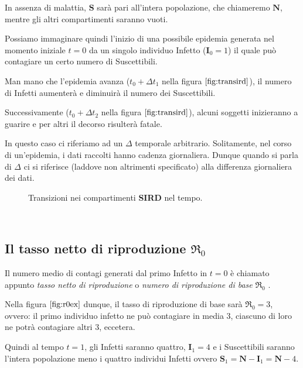 \documentclass[11pt]{article}
\begin{document}
In assenza di malattia, \(\mathbf{S}\) sarà pari all'intera popolazione,
che chiameremo \(\mathbf{N}\), mentre gli altri compartimenti saranno
vuoti.

Possiamo immaginare quindi l'inizio di una possibile epidemia generata
nel momento iniziale \(t=0\) da un singolo individuo Infetto
(\(\mathbf{I}_0 = 1\)) il quale può contagiare un certo numero di
Suscettibili.

Man mano che l'epidemia avanza (\(t_0 + \Delta t_1\) nella figura
\(\ref{fig:transird}\)), il numero di Infetti aumenterà e diminuirà il
numero dei Suscettibili.

Successivamente (\(t_0 + \Delta t_2\) nella figura
\(\ref{fig:transird}\)), alcuni soggetti inizieranno a guarire e per
altri il decorso risulterà fatale.

In questo caso ci riferiamo ad un \(\Delta\) temporale arbitrario.
Solitamente, nel corso di un'epidemia, i dati raccolti hanno cadenza
giornaliera. Dunque quando si parla di \(\Delta\) ci si riferisce
(laddove non altrimenti specificato) alla differenza giornaliera dei
dati.

    \begin{figure}
    \caption{Transizioni nei compartimenti \textbf{SIRD} nel tempo.}
    \label{fig:transird}
    \end{figure}
    { \hspace*{\fill} \\}
    
    \hypertarget{il-tasso-netto-di-riproduzione-re_0}{%
\subsection{\texorpdfstring{Il tasso netto di riproduzione
\(\Re_0\)}{Il tasso netto di riproduzione \textbackslash Re\_0}}\label{il-tasso-netto-di-riproduzione-re_0}}

    Il numero medio di contagi generati dal primo Infetto in \(t=0\) è
chiamato appunto \emph{tasso netto di riproduzione} o \emph{numero di
riproduzione di base} \(\Re_0\) \cite{jones_2007}.

    Nella figura \(\ref{fig:r0ex}\) dunque, il tasso di riproduzione di base
sarà \(\Re_0 = 3\), ovvero: il primo individuo infetto ne può contagiare
in media 3, ciascuno di loro ne potrà contagiare altri 3, eccetera.

Quindi al tempo \(t=1\), gli Infetti saranno quattro,
\(\mathbf{I}_1 = 4\) e i Suscettibili saranno l'intera popolazione meno
i quattro individui Infetti ovvero
\(\mathbf{S}_1 = \mathbf{N} - \mathbf{I}_1 = \mathbf{N} - 4\).
\end{document}

